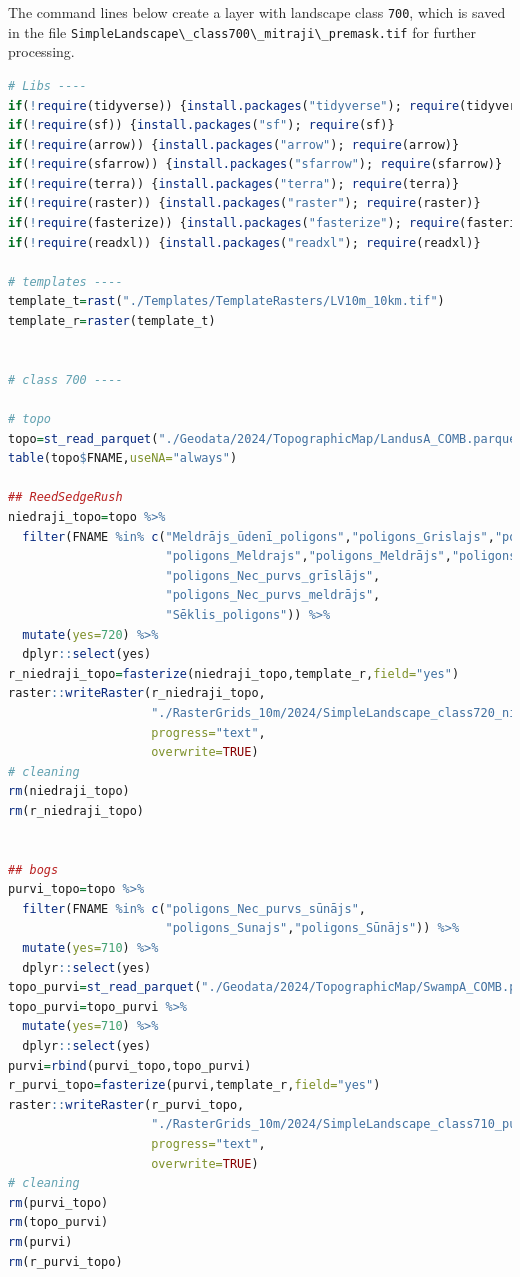\documentclass[
]{book}
\newcommand{\passthrough}[1]{#1}
\begin{document}
The command lines below create a layer with landscape class \passthrough{\lstinline!700!}, which is saved
in the file \passthrough{\lstinline!SimpleLandscape\_class700\_mitraji\_premask.tif!} for further processing.

\begin{lstlisting}[language=R]
# Libs ----
if(!require(tidyverse)) {install.packages("tidyverse"); require(tidyverse)}
if(!require(sf)) {install.packages("sf"); require(sf)}
if(!require(arrow)) {install.packages("arrow"); require(arrow)}
if(!require(sfarrow)) {install.packages("sfarrow"); require(sfarrow)}
if(!require(terra)) {install.packages("terra"); require(terra)}
if(!require(raster)) {install.packages("raster"); require(raster)}
if(!require(fasterize)) {install.packages("fasterize"); require(fasterize)}
if(!require(readxl)) {install.packages("readxl"); require(readxl)}

# templates ----
template_t=rast("./Templates/TemplateRasters/LV10m_10km.tif")
template_r=raster(template_t)


# class 700 ----

# topo
topo=st_read_parquet("./Geodata/2024/TopographicMap/LandusA_COMB.parquet")
table(topo$FNAME,useNA="always")

## ReedSedgeRush
niedraji_topo=topo %>% 
  filter(FNAME %in% c("Meldrājs_ūdenī_poligons","poligons_Grislajs","poligons_Grīslājs",
                      "poligons_Meldrajs","poligons_Meldrājs","poligons_Meldrajs_udeni",
                      "poligons_Nec_purvs_grīslājs",
                      "poligons_Nec_purvs_meldrājs",
                      "Sēklis_poligons")) %>% 
  mutate(yes=720) %>% 
  dplyr::select(yes)
r_niedraji_topo=fasterize(niedraji_topo,template_r,field="yes")
raster::writeRaster(r_niedraji_topo,
                    "./RasterGrids_10m/2024/SimpleLandscape_class720_niedraji_topo.tif",
                    progress="text",
                    overwrite=TRUE)
# cleaning
rm(niedraji_topo)
rm(r_niedraji_topo)


## bogs
purvi_topo=topo %>% 
  filter(FNAME %in% c("poligons_Nec_purvs_sūnājs",
                      "poligons_Sunajs","poligons_Sūnājs")) %>% 
  mutate(yes=710) %>% 
  dplyr::select(yes)
topo_purvi=st_read_parquet("./Geodata/2024/TopographicMap/SwampA_COMB.parquet")
topo_purvi=topo_purvi %>% 
  mutate(yes=710) %>% 
  dplyr::select(yes)
purvi=rbind(purvi_topo,topo_purvi)
r_purvi_topo=fasterize(purvi,template_r,field="yes")
raster::writeRaster(r_purvi_topo,
                    "./RasterGrids_10m/2024/SimpleLandscape_class710_purvi_topo.tif",
                    progress="text",
                    overwrite=TRUE)
# cleaning
rm(purvi_topo)
rm(topo_purvi)
rm(purvi)
rm(r_purvi_topo)



\end{lstlisting}
\end{document}
